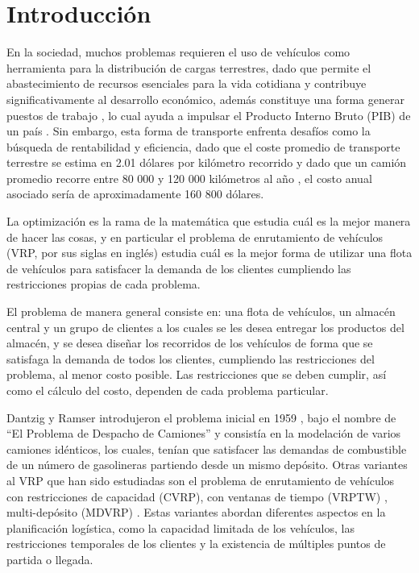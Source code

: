 \documentclass[12pt]{article}
\begin{document}
\section{Introducción}
En la sociedad, muchos problemas requieren el uso de vehículos como herramienta para la distribución de cargas terrestres, dado que permite el abastecimiento de recursos esenciales para la vida cotidiana y contribuye significativamente al desarrollo económico, además constituye una forma generar puestos de trabajo \cite{ref23}, lo cual ayuda a impulsar el Producto Interno Bruto (PIB) de un país \cite{ref23}. Sin embargo, esta forma de transporte enfrenta desafíos como la búsqueda de rentabilidad y eficiencia, dado que el coste promedio de transporte terrestre se estima en 2.01 dólares por kilómetro recorrido \cite{ref1} y dado que un camión promedio recorre entre 80 000 y 120 000 kilómetros al año \cite{ref22}, el costo anual asociado sería de aproximadamente 160 800 dólares.

La optimización es la rama de la matemática que estudia cuál es la mejor manera de hacer las cosas, y en particular el problema de enrutamiento de vehículos (VRP, por sus siglas en inglés) estudia cuál es la mejor forma de utilizar una flota de vehículos para satisfacer la demanda de los clientes cumpliendo las restricciones propias de cada problema.

El problema de manera general consiste en: una flota de vehículos, un almacén central y un grupo de clientes a los cuales se les desea entregar los productos del almacén, y se desea diseñar los recorridos de los vehículos de forma que se satisfaga la demanda de todos los clientes, cumpliendo las restricciones del problema, al menor costo posible. Las restricciones que se deben cumplir, así como el cálculo del costo, dependen de cada problema particular.

Dantzig y Ramser introdujeron el problema inicial en 1959 \cite{ref18}, bajo el nombre de ``El Problema de Despacho de Camiones'' y consistía en la modelación de varios camiones idénticos, los cuales, tenían que satisfacer las demandas de combustible de un número de gasolineras partiendo desde un mismo depósito. Otras variantes al VRP que han sido estudiadas son el problema de enrutamiento de vehículos con restricciones de capacidad (CVRP), con ventanas de tiempo (VRPTW) \cite{ref16}, multi-depósito (MDVRP) \cite{ref17}. Estas variantes abordan diferentes aspectos en la planificación logística, como la capacidad limitada de los vehículos, las restricciones temporales de los clientes y la existencia de múltiples puntos de partida o llegada.
\end{document}
